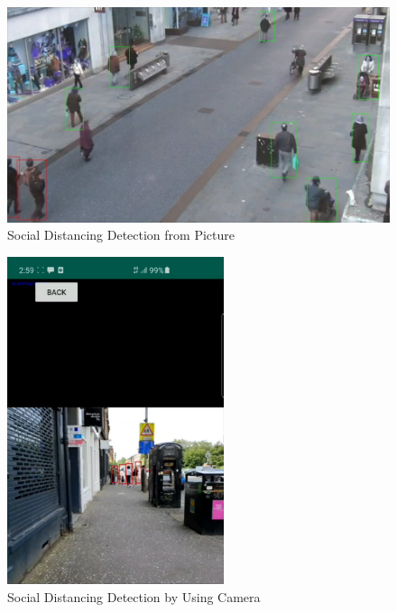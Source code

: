     \begin{figure}[!ht]
        \includegraphics[width=6in]{images/chapter5/application/picture-detection.jpg}
        \caption{Social Distancing Detection from Picture}
        \label{appendix-b:sampleResult}
    \end{figure}

    \begin{figure}[!ht]
        \centering
        \includegraphics[width=2.5in]{images/chapter5/application/camera-detection.jpg}
        \caption{Social Distancing Detection by Using Camera}
        \label{appendix-b:camera}
    \end{figure}